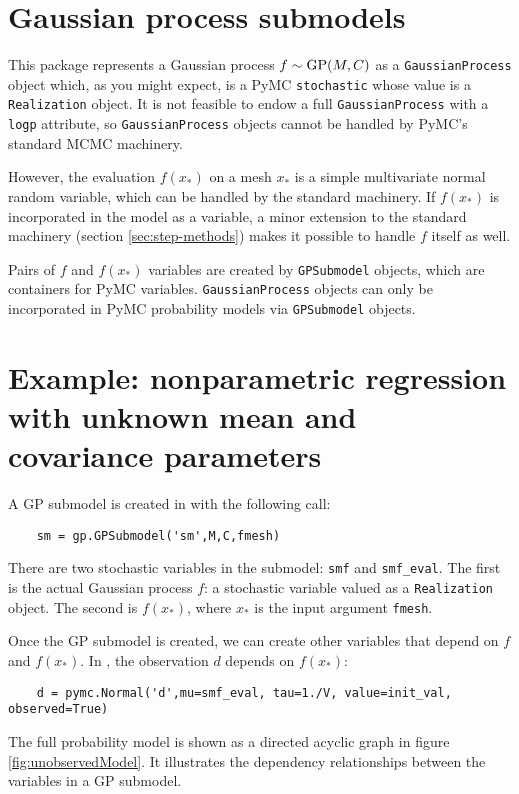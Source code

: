 






\section{Gaussian process submodels}

This package represents a Gaussian process $f\sim \textup{GP}(M,C)$ as a \texttt{GaussianProcess} object which, as you might expect, is a PyMC \texttt{stochastic} whose value is a \texttt{Realization} object. It is not feasible to endow a full \texttt{GaussianProcess} with a \texttt{logp} attribute, so \texttt{GaussianProcess} objects cannot be handled by PyMC's standard MCMC machinery.

However, the evaluation $f(x_*)$ on a mesh $x_*$ is a simple multivariate normal random variable, which can be handled by the standard machinery. If $f(x_*)$ is incorporated in the model as a variable, a minor extension to the standard machinery (section \ref{sec:step-methods}) makes it possible to handle $f$ itself as well.

Pairs of $f$ and $f(x_*)$ variables are created by \texttt{GPSubmodel} objects, which are containers for PyMC variables. \texttt{GaussianProcess} objects can only be incorporated in PyMC probability models via \texttt{GPSubmodel} objects.






\section{Example: nonparametric regression with unknown mean and covariance parameters}\label{sub:BasicMCMC}

A GP submodel is created in  with the following call:
\begin{verbatim}
    sm = gp.GPSubmodel('sm',M,C,fmesh)
\end{verbatim}
There are two stochastic variables in the submodel: \texttt{smf} and \texttt{smf_eval}. The first is the actual Gaussian process $f$: a stochastic variable valued as a \texttt{Realization} object. The second is $f(x_*)$, where $x_*$ is the input argument \texttt{fmesh}.

Once the GP submodel is created, we can create other variables that depend on $f$ and $f(x_*)$. In , the observation $d$ depends on $f(x_*)$: 
\begin{verbatim}
    d = pymc.Normal('d',mu=smf_eval, tau=1./V, value=init_val, observed=True)
\end{verbatim}
The full probability model is shown as a directed acyclic graph in figure \ref{fig:unobservedModel}. It illustrates the dependency relationships between the variables in a GP submodel.

